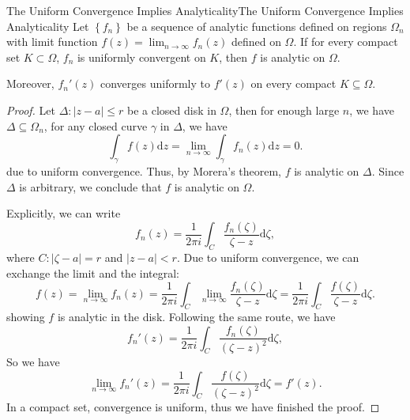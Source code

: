 \documentclass[../main.tex]{subfiles}
\begin{document}
\begin{theorem}{The Uniform Convergence Implies Analyticality}{The Uniform Convergence Implies Analyticality}
	Let $\left\{ f_n \right\}$ be a sequence of analytic functions defined on regions $\Omega_n$ with limit function $f(z) = \lim_{n \to \infty } f_n(z)$ defined on $\Omega$. If for every compact set $K \subset \Omega$, $f_n$ is uniformly convergent on $K$, then $f$ is analytic on $\Omega$.

	Moreover, $f_n'(z)$ converges uniformly to $f'(z)$ on every compact $K \subseteq \Omega$.
\end{theorem}
\begin{proof}
	Let $\Delta: \left|z-a\right|\leq r$ be a closed disk in $\Omega$, then for enough large $n$, we have $\Delta \subseteq \Omega_n$, for any closed curve $\gamma$ in $\Delta$, we have
	\begin{equation*}
		\int_{\gamma} f(z) \mathrm{d} z = \lim_{n \to \infty} \int_{\gamma} f_n(z) \mathrm{d} z = 0.
	\end{equation*}
	due to uniform convergence. Thus, by Morera's theorem, $f$ is analytic on $\Delta$. Since $\Delta$ is arbitrary, we conclude that $f$ is analytic on $\Omega$.

	Explicitly, we can write
	\begin{equation*}
		f_n(z) = \frac{1}{2 \pi i}\int_C \frac{f_n(\zeta)}{\zeta - z} \mathrm{d} \zeta,
	\end{equation*}
	where $C: \left|\zeta-a\right|=r$ and $\left|z-a\right|<r$. Due to uniform convergence, we can exchange the limit and the integral:
	\begin{equation*}
		f(z) = \lim_{n \to \infty} f_n(z) = \frac{1}{2 \pi i}\int_C \lim_{n \to \infty} \frac{f_n(\zeta)}{\zeta - z} \mathrm{d} \zeta = \frac{1}{2 \pi i}\int_C \frac{f(\zeta)}{\zeta - z} \mathrm{d} \zeta.
	\end{equation*}
	showing $f$ is analytic in the disk.
Following the same route, we have
\begin{equation*}
	 f_n'(z) = \frac{1}{2 \pi i}\int_C \frac{f_n(\zeta)}{(\zeta - z)^2} \mathrm{d} \zeta,
\end{equation*}
So we have
\begin{equation}
 	\lim_{n \to \infty } f_n'(z) = \frac{1}{2 \pi i}\int_C \frac{f(\zeta)}{(\zeta - z)^2} \mathrm{d} \zeta = f'(z).
\end{equation}
In a compact set, convergence is uniform, thus we have finished the proof.
\end{proof}
\end{document}
